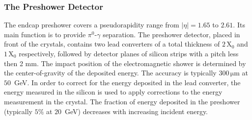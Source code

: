 \subsubsection{The Preshower Detector} 
The endcap preshower covers a pseudorapidity range from $|\eta| = 1.65$ to $2.61$.  Its main function is to provide $\pi^{0}$-$\gamma$ separation. The preshower detector, placed in front of the crystals, contains two lead converters of a total thickness of $2 \,$X$_0$ and $1 \,$X$_0$ respectively, followed by detector planes of silicon strips with a pitch less then 2 mm. The impact position of the electromagnetic shower is determined by the center-of-gravity of the deposited energy. The accuracy is typically $300 \,\mathrm{\mu m}$ at $50 \,$ GeV. In order to correct for the energy deposited in the lead converter, the energy measured in the silicon is used to apply corrections to the energy measurement in the crystal. The fraction of energy deposited in the preshower (typically $5\%$ at $20 \,$ GeV) decreases with increasing incident energy.

